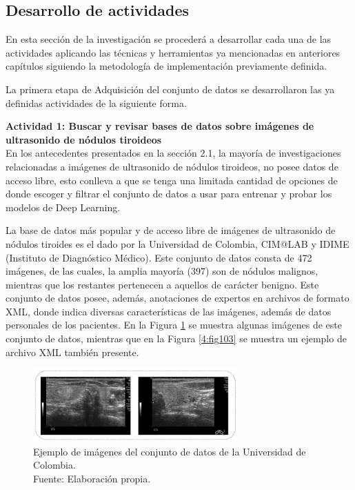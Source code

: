 \subsection{Desarrollo de actividades}

En esta sección de la investigación se procederá a desarrollar cada una de las actividades aplicando las técnicas y herramientas ya mencionadas en anteriores capítulos siguiendo la metodología de implementación previamente definida.

La primera etapa de Adquisición del conjunto de datos se desarrollaron las ya definidas actividades de la siguiente forma.

\textbf{Actividad 1: Buscar y revisar bases de datos sobre imágenes de ultrasonido de nódulos tiroideos}
\\
En los antecedentes presentados en la sección 2.1, la mayoría de investigaciones relacionadas a imágenes de ultrasonido de nódulos tiroideos, no posee datos de acceso libre, esto conlleva a que se tenga una limitada cantidad de opciones de donde escoger y filtrar el conjunto de datos a usar para entrenar y probar los modelos de Deep Learning.

La base de datos más popular y de acceso libre de imágenes de ultrasonido de nódulos tiroides es el dado por la Universidad de Colombia, CIM@LAB y IDIME (Instituto de Diagnóstico Médico). Este conjunto de datos consta de 472 imágenes, de las cuales, la amplia mayoría (397) son de nódulos malignos, mientras que los restantes pertenecen a aquellos de carácter benigno. Este conjunto de datos posee, además, anotaciones de expertos en archivos de formato XML, donde indica diversas características de las imágenes, además de datos personales de los pacientes. En la Figura \ref{4:fig102} se muestra algunas imágenes de este conjunto de datos, mientras que en la Figura \ref{4:fig103} se muestra un ejemplo de archivo XML también presente.

\begin{figure}[H]
	\begin{center}
		\includegraphics[width=0.70\textwidth]{4/figures/nodule_ddti.png}
		\caption[Ejemplo de imágenes del conjunto de datos de la Universidad de Colombia]{Ejemplo de imágenes del conjunto de datos de la Universidad de Colombia. \\
		Fuente: Elaboración propia.}
		\label{4:fig102}
	\end{center}
\end{figure}

